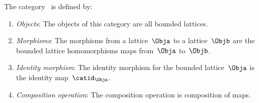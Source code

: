 \begin{ctdefinition}
	\label{def:BoundedLat}
	The category~\iindex{\BoundedLat} is defined by:
	\begin{enumerate}
		\item \emph{Objects}: The objects of this category are all bounded lattices.
		\item \emph{Morphisms}: The morphisms from a lattice~$\Obja$ to a lattice~$\Objb$ are the bounded lattice homomorphisms maps from~$\Obja$ to~$\Objb$.
		\item \emph{Identity morphism}: The identity morphism for the bounded lattice~$\Obja$
		      is the identity map~$\catid_\Obja$.
		\item \emph{Composition operation}: The composition operation is composition of maps.
	\end{enumerate}
\end{ctdefinition}

